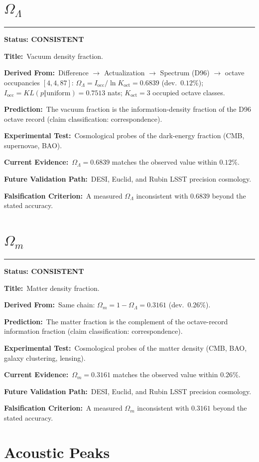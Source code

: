 \documentclass[11pt,a4paper]{article}
\newcommand{\predstart}[2]{%
  \par\medskip\noindent\hrule\par\smallskip
  \noindent{\large\bfseries #1}\hfill{\bfseries Status: #2}\par\smallskip
}
\newcommand{\pfield}[2]{%
  \noindent\textbf{#1:}~#2\par\smallskip
}
\begin{document}
\section{$\Omega_\Lambda$}
\label{sec:omegal}

\predstart{AT-P024}{CONSISTENT}
\pfield{Title}{Vacuum density fraction.}
\pfield{Derived From}{Difference $\to$ Actualization $\to$ Spectrum (D96) $\to$ octave
occupancies $[4,4,87]$: $\Omega_\Lambda = I_{\mathrm{occ}}/\ln K_{\mathrm{oct}} = 0.6839$
(dev.\ $0.12\%$); $I_{\mathrm{occ}} = KL(p\Vert\mathrm{uniform}) = 0.7513$ nats;
$K_{\mathrm{oct}} = 3$ occupied octave classes.}
\pfield{Prediction}{The vacuum fraction is the information-density fraction of the D96
octave record (claim classification: correspondence).}
\pfield{Experimental Test}{Cosmological probes of the dark-energy fraction (CMB, supernovae,
BAO).}
\pfield{Current Evidence}{$\Omega_\Lambda = 0.6839$ matches the observed value within
$0.12\%$.}
\pfield{Future Validation Path}{DESI, Euclid, and Rubin LSST precision cosmology.}
\pfield{Falsification Criterion}{A measured $\Omega_\Lambda$ inconsistent with $0.6839$
beyond the stated accuracy.}

\section{$\Omega_m$}
\label{sec:omegam}

\predstart{AT-P025}{CONSISTENT}
\pfield{Title}{Matter density fraction.}
\pfield{Derived From}{Same chain: $\Omega_m = 1 - \Omega_\Lambda = 0.3161$ (dev.\ $0.26\%$).}
\pfield{Prediction}{The matter fraction is the complement of the octave-record information
fraction (claim classification: correspondence).}
\pfield{Experimental Test}{Cosmological probes of the matter density (CMB, BAO, galaxy
clustering, lensing).}
\pfield{Current Evidence}{$\Omega_m = 0.3161$ matches the observed value within $0.26\%$.}
\pfield{Future Validation Path}{DESI, Euclid, and Rubin LSST precision cosmology.}
\pfield{Falsification Criterion}{A measured $\Omega_m$ inconsistent with $0.3161$ beyond the
stated accuracy.}

\section{Acoustic Peaks}
\label{sec:peaks}
\end{document}
